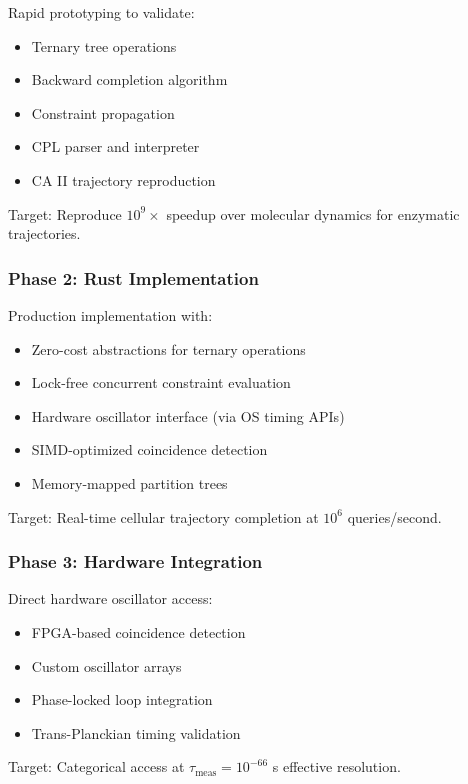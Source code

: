 Rapid prototyping to validate:
\begin{itemize}
\item Ternary tree operations
\item Backward completion algorithm
\item Constraint propagation
\item CPL parser and interpreter
\item CA II trajectory reproduction
\end{itemize}

Target: Reproduce $10^9\times$ speedup over molecular dynamics for enzymatic trajectories.

\subsubsection{Phase 2: Rust Implementation}

Production implementation with:
\begin{itemize}
\item Zero-cost abstractions for ternary operations
\item Lock-free concurrent constraint evaluation
\item Hardware oscillator interface (via OS timing APIs)
\item SIMD-optimized coincidence detection
\item Memory-mapped partition trees
\end{itemize}

Target: Real-time cellular trajectory completion at $10^6$ queries/second.

\subsubsection{Phase 3: Hardware Integration}

Direct hardware oscillator access:
\begin{itemize}
\item FPGA-based coincidence detection
\item Custom oscillator arrays
\item Phase-locked loop integration
\item Trans-Planckian timing validation
\end{itemize}

Target: Categorical access at $\tau_{\text{meas}} = 10^{-66}$ s effective resolution.
